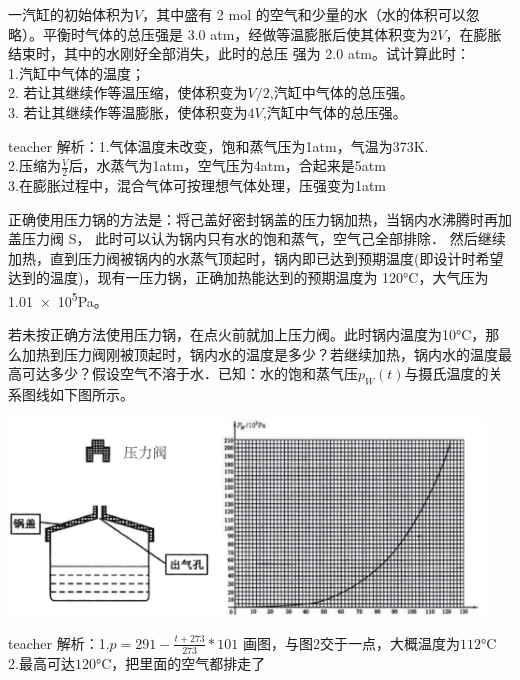 \begin{example}
	一汽缸的初始体积为$V$，其中盛有 2 \si{mol} 的空气和少量的水（水的体积可以忽略）。平衡时气体的总压强是 3.0 atm，经做等温膨胀后使其体积变为$ 2V$，在膨胀结束时，其中的水刚好全部消失，此时的总压 强为 2.0 atm。试计算此时：
	\\1.汽缸中气体的温度； 
	\\2. 若让其继续作等温压缩，使体积变为$ V/2$,汽缸中气体的总压强。 
	\\3. 若让其继续作等温膨胀，使体积变为$ 4V$,汽缸中气体的总压强。
	\begin{taggedblock}{teacher}
		\newline
		解析：1.气体温度未改变，饱和蒸气压为1atm，气温为373K.
		\\2.压缩为$\frac{V}{2}$后，水蒸气为1atm，空气压为4atm，合起来是5atm
		\\3.在膨胀过程中，混合气体可按理想气体处理，压强变为1atm
	\end{taggedblock}
\end{example}

\begin{example}
正确使用压力锅的方法是：将己盖好密封锅盖的压力锅加热，当锅内水沸腾时再加盖压力阀 S， 此时可以认为锅内只有水的饱和蒸气，空气己全部排除．
然后继续加热，直到压力阀被锅内的水蒸气顶起时，锅内即已达到预期温度(即设计时希望达到的温度)，现有一压力锅，正确加热能达到的预期温度为 120\si{\degreeCelsius}，大气压为\num{1.01e5}\si{Pa}。

若未按正确方法使用压力锅，在点火前就加上压力阀。此时锅内温度为10\si{\degreeCelsius}，那么加热到压力阀刚被顶起时，锅内水的温度是多少？若继续加热，锅内水的温度最高可达多少？假设空气不溶于水．已知：水的饱和蒸气压$p_W(t)$与摄氏温度的关系图线如下图所示。
\begin{center}
	\includegraphics[width=0.95\textwidth]{images/thermal-18.pdf}
\end{center}
\begin{taggedblock}{teacher}
\noindent
解析：1.$p=291-\frac{t+273}{273}*101$ 画图，与图2交于一点，大概温度为$112\si{\degreeCelsius}$
\\2.最高可达$120\si{\degreeCelsius}$，把里面的空气都排走了
\end{taggedblock}
\end{example}


